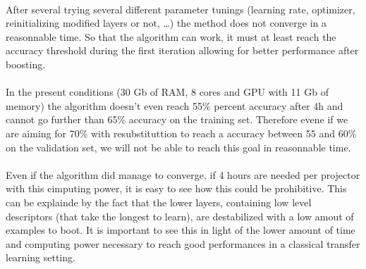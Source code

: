 \documentclass[11 pt]{article}
\begin{document}
\paragraph{}After several trying several different parameter tunings (learning rate, optimizer, reinitializing modified layers or not, \ldots) the method does not converge in a reasonnable time. So that the algorithm can work, it must at least reach the accuracy threshold during the first iteration allowing for better performance after boosting. 

\paragraph{} In the present conditions (30 Gb of RAM, 8 cores and GPU with 11 Gb of memory) the algorithm doesn't even reach 55\% percent accuracy after 4h and cannot go further than 65\% accuracy on the training set. Therefore evene if we are aiming for 70\% with resubstituttion to reach a accuracy between 55 and 60\% on the validation set, we will not be able to reach this goal in reasonnable time. 

\paragraph{} Even if the algorithm did manage to converge, if 4 hours are needed per projector with this cimputing power, it is easy to see how this could be prohibitive. This can be explainde by the fact that the lower layers, containing low level descriptors (that take the longest to learn), are destabilized with a low amout of examples to boot. It is important to see this in light of the lower amount of time and computing power necessary to reach good performances in a classical transfer learning setting.   
\end{document}
